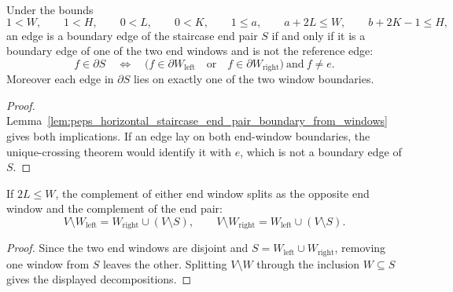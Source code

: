 \begin{theorem}
    \label{thm:peps_horizontal_staircase_end_pair_boundary}
    \leanok
    Under the bounds
    \[
        1<W,\qquad 1<H,\qquad 0<L,\qquad 0<K,\qquad 1\le a,\qquad
        a+2L\le W,\qquad b+2K-1\le H,
    \]
    an edge is a boundary edge of the staircase end pair $S$ if and only if it
    is a boundary edge of one of the two end windows and is not the reference
    edge:
    \[
        f\in\partial S
        \quad\Longleftrightarrow\quad
        \bigl(f\in\partial W_{\mathrm{left}}
        \quad\text{or}\quad
        f\in\partial W_{\mathrm{right}}\bigr)
        \ \text{and}\ f\ne e.
    \]
    Moreover each edge in $\partial S$ lies on exactly one of the two window
    boundaries.
\end{theorem}
\begin{proof}
    \leanok
    Lemma~\ref{lem:peps_horizontal_staircase_end_pair_boundary_from_windows}
    gives both implications.  If an edge lay on both end-window boundaries,
    the unique-crossing theorem would identify it with $e$, which is not a
    boundary edge of $S$.
\end{proof}

\begin{lemma}
    \label{lem:peps_horizontal_staircase_end_window_complement_split}
    \leanok
    If $2L\le W$, the complement of either end window splits as the opposite
    end window and the complement of the end pair:
    \[
        V\setminus W_{\mathrm{left}}
        =
        W_{\mathrm{right}}\cup (V\setminus S),
        \qquad
        V\setminus W_{\mathrm{right}}
        =
        W_{\mathrm{left}}\cup (V\setminus S).
    \]
\end{lemma}
\begin{proof}
    \leanok
    Since the two end windows are disjoint and
    $S=W_{\mathrm{left}}\cup W_{\mathrm{right}}$, removing one window from
    $S$ leaves the other.  Splitting $V\setminus W$ through the inclusion
    $W\subseteq S$ gives the displayed decompositions.
\end{proof}

